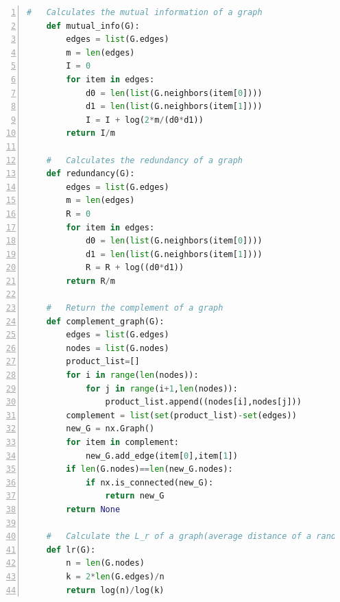 \documentclass[12pt]{article}
\begin{document}
\begin{lstlisting}[numbers=left,language=Python,breaklines=true]
    #   Calculates the mutual information of a graph
    def mutual_info(G):
        edges = list(G.edges)
        m = len(edges)
        I = 0
        for item in edges:
            d0 = len(list(G.neighbors(item[0])))
            d1 = len(list(G.neighbors(item[1]))) 
            I = I + log(2*m/(d0*d1))
        return I/m
    
    #   Calculates the redundancy of a graph
    def redundancy(G):
        edges = list(G.edges)
        m = len(edges)
        R = 0
        for item in edges:
            d0 = len(list(G.neighbors(item[0])))
            d1 = len(list(G.neighbors(item[1]))) 
            R = R + log((d0*d1))
        return R/m
    
    #   Return the complement of a graph
    def complement_graph(G):
        edges = list(G.edges)
        nodes = list(G.nodes)
        product_list=[]
        for i in range(len(nodes)):
            for j in range(i+1,len(nodes)):
                product_list.append((nodes[i],nodes[j]))
        complement = list(set(product_list)-set(edges))
        new_G = nx.Graph()
        for item in complement:
            new_G.add_edge(item[0],item[1])
        if len(G.nodes)==len(new_G.nodes):
            if nx.is_connected(new_G):
                return new_G
        return None
    
    #   Calculate the L_r of a graph(average distance of a random graph with given m and n)
    def lr(G):
        n = len(G.nodes)
        k = 2*len(G.edges)/n
        return log(n)/log(k)
\end{lstlisting}
\end{document}
